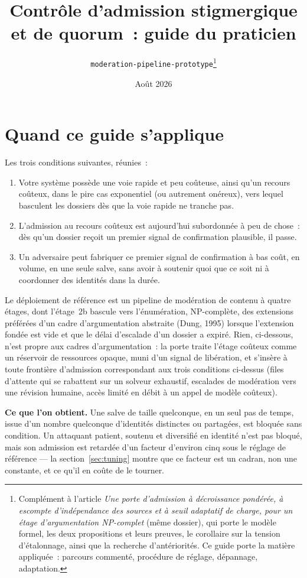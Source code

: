 \documentclass[11pt]{article}
\title{Contrôle d'admission stigmergique et de quorum~: guide du praticien}
\author{\texttt{moderation-pipeline-prototype}\thanks{Complément à
    l'article \emph{Une porte d'admission à décroissance pondérée, à
    escompte d'indépendance des sources et à seuil adaptatif de charge,
    pour un étage d'argumentation NP-complet} (même dossier), qui porte
    le modèle formel, les deux propositions et leurs preuves, le
    corollaire sur la tension d'étalonnage, ainsi que la recherche
    d'antériorités. Ce guide porte la matière appliquée~: parcours
    commenté, procédure de réglage, dépannage, adaptation.}}
\date{Août 2026}
\begin{document}
\maketitle

\section{Quand ce guide s'applique}
\label{sec:when}

Les trois conditions suivantes, réunies~:

\begin{enumerate}
\item Votre système possède une voie rapide et peu coûteuse, ainsi qu'un
  recours coûteux, dans le pire cas exponentiel (ou autrement onéreux),
  vers lequel basculent les dossiers dès que la voie rapide ne tranche
  pas.
\item L'admission au recours coûteux est aujourd'hui subordonnée à peu de
  chose~: dès qu'un dossier reçoit un premier signal de confirmation
  plausible, il passe.
\item Un adversaire peut fabriquer ce premier signal de confirmation à
  bas coût, en volume, en une seule salve, sans avoir à soutenir quoi que
  ce soit ni à coordonner des identités dans la durée.
\end{enumerate}

Le déploiement de référence est un pipeline de modération de contenu à
quatre étages, dont l'étage~2b bascule vers l'énumération, NP-complète,
des extensions préférées d'un cadre d'argumentation abstraite (Dung,
1995) lorsque l'extension fondée est vide et que le délai d'escalade
d'un dossier a expiré. Rien, ci-dessous, n'est propre aux cadres
d'argumentation~: la porte traite l'étage coûteux comme un réservoir de
ressources opaque, muni d'un signal de libération, et s'insère à toute
frontière d'admission correspondant aux trois conditions ci-dessus (files
d'attente qui se rabattent sur un solveur exhaustif, escalades de
modération vers une révision humaine, accès limité en débit à un appel de
modèle coûteux).

\medskip
\noindent
\textbf{Ce que l'on obtient.} Une salve de taille quelconque, en un seul
pas de temps, issue d'un nombre quelconque d'identités distinctes ou
partagées, est bloquée sans condition. Un attaquant patient, soutenu et
diversifié en identité n'est pas bloqué, mais son admission est retardée
d'un facteur d'environ cinq sous le réglage de référence --- la
section~\ref{sec:tuning} montre que ce facteur est un cadran, non une
constante, et ce qu'il en coûte de le tourner.
\end{document}

